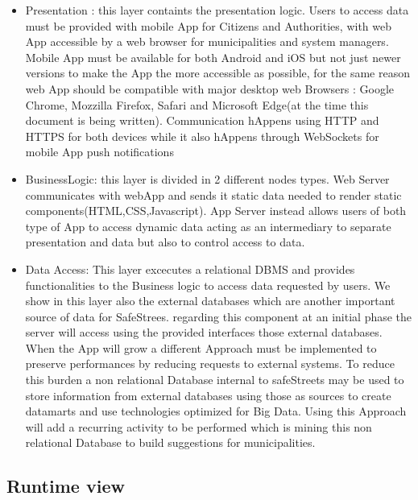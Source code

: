 \begin{itemize}
\item Presentation : this layer containts the presentation logic. Users to access data must be provided with mobile App for Citizens and Authorities, with web App accessible by a web browser for municipalities and system managers.
Mobile App must be available for both Android and iOS but not just newer versions to make the App the more accessible as possible, for the same reason web App should be compatible with major desktop web Browsers  : Google Chrome, Mozzilla Firefox, Safari and Microsoft Edge(at the time this document is being written).
Communication hAppens using HTTP and HTTPS for both devices while it also hAppens through WebSockets for mobile App push notifications
\item BusinessLogic: this layer is divided in 2 different nodes types. Web Server communicates with webApp and sends it static data needed to render static components(HTML,CSS,Javascript). App Server instead allows users of both type of App to access dynamic data acting as an intermediary to separate presentation and data but also to control access to data.
\item Data Access: This layer excecutes a relational DBMS and provides functionalities to the Business logic to access data requested by users. We show in this layer also the external databases which are another important source of data for SafeStrees.
regarding this component at an initial phase the server will access using the provided interfaces those external databases. When the App will grow a different Approach must be implemented to preserve performances by reducing requests to external systems. To reduce this burden a non relational Database internal to safeStreets may be used to store information from external databases using those as sources to create datamarts and use technologies optimized for Big Data. Using this Approach will add a recurring activity to be performed which is mining this non relational Database to build suggestions for municipalities.
\end{itemize}
\newpage
\subsection{Runtime view}
